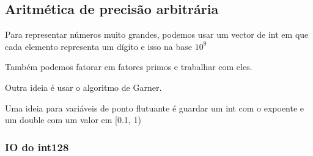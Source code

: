 \subsection{Aritmética de precisão arbitrária}

Para representar números muito grandes, podemos usar um vector de int em que cada elemento representa um dígito e isso na base $10^9$


Também podemos fatorar em fatores primos e trabalhar com eles.

Outra ideia é usar o algoritmo de Garner.

Uma ideia para variáveis de ponto flutuante é guardar um int com o expoente e um double com um valor em [0.1, 1)

\subsubsection{IO do int128}


